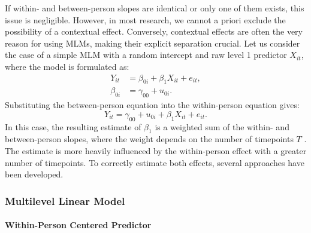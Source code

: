 \documentclass[stu]{apa7}
\begin{document}
If within- and between-person slopes are identical or only one of them exists, this issue is negligible. However, in most research, we cannot a priori exclude the possibility of a contextual effect. Conversely, contextual effects are often the very reason for using MLMs, making their explicit separation crucial. Let us consider the case of a simple MLM with a random intercept and raw level 1 predictor $X_{it}$, where the model is formulated as:
\begin{align}
Y_{it} &= \beta_{0i} + \beta_1 X_{it} + e_{it},  \\
\beta_{0i} &= \gamma_{00} + u_{0i}.
\end{align}
Substituting the between-person equation into the within-person equation gives:
\begin{equation}
Y_{it} = \gamma_{00} + u_{0i} + \beta_ 1 X_{it} + e_{it}.
\end{equation}
In this case, the resulting estimate of $\beta_1$ is a weighted sum of the within- and between-person slopes, where the weight depends on the number of timepoints $T$ \parencite{mundlak_pooling_1978}. The estimate is more heavily influenced by the within-person effect with a greater number of timepoints. To correctly estimate both effects, several approaches have been developed.

\subsubsection{Multilevel Linear Model}

\paragraph{Within-Person Centered Predictor}
\end{document}
